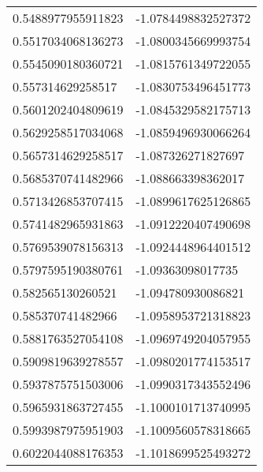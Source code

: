 \begin{supertabular}{ll}
0.5488977955911823  & -1.0784498832527372   \\
0.5517034068136273  & -1.0800345669993754   \\
0.5545090180360721  & -1.0815761349722055   \\
0.557314629258517   & -1.0830753496451773   \\
0.5601202404809619  & -1.0845329582175713   \\
0.5629258517034068  & -1.0859496930066264   \\
0.5657314629258517  & -1.087326271827697    \\
0.5685370741482966  & -1.088663398362017    \\
0.5713426853707415  & -1.0899617625126865   \\
0.5741482965931863  & -1.0912220407490698   \\
0.5769539078156313  & -1.0924448964401512   \\
0.5797595190380761  & -1.09363098017735     \\
0.582565130260521   & -1.094780930086821    \\
0.585370741482966   & -1.0958953721318823   \\
0.5881763527054108  & -1.0969749204057955   \\
0.5909819639278557  & -1.0980201774153517   \\
0.5937875751503006  & -1.0990317343552496   \\
0.5965931863727455  & -1.1000101713740995   \\
0.5993987975951903  & -1.1009560578318665   \\
0.6022044088176353  & -1.1018699525493272   \\
\end{supertabular}
